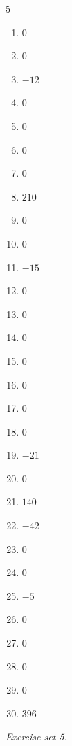 \begin{multicols}{5}\raggedright
\begin{enumerate}[label=\arabic*., leftmargin=*, itemsep=1pt]
\item $0$
\item $0$
\item $-12$
\item $0$
\item $0$
\item $0$
\item $0$
\item $210$
\item $0$
\item $0$
\item $-15$
\item $0$
\item $0$
\item $0$
\item $0$
\item $0$
\item $0$
\item $0$
\item $-21$
\item $0$
\item $140$
\item $-42$
\item $0$
\item $0$
\item $-5$
\item $0$
\item $0$
\item $0$
\item $0$
\item $396$
\end{enumerate}
\end{multicols}
\par\noindent\emph{Exercise set 5.}\nopagebreak
